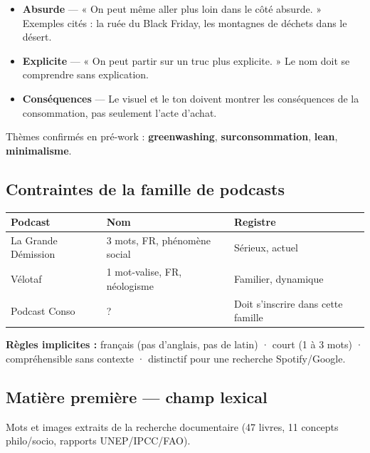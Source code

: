 \documentclass[a4paper,11pt]{article}
\newcommand{\tableheader}{\rowcolor{tableHeader}\bfseries}
\begin{document}
\begin{tcolorbox}[highlight card, title=Brief créatif — verbatim Olivier]
\begin{itemize}[nosep]
  \item \textbf{Absurde} — « On peut même aller plus loin dans le côté absurde. » Exemples cités : la ruée du Black Friday, les montagnes de déchets dans le désert.
  \item \textbf{Explicite} — « On peut partir sur un truc plus explicite. » Le nom doit se comprendre sans explication.
  \item \textbf{Conséquences} — Le visuel et le ton doivent montrer les conséquences de la consommation, pas seulement l'acte d'achat.
\end{itemize}
\end{tcolorbox}

\noindent Thèmes confirmés en pré-work : \textbf{greenwashing}, \textbf{surconsommation}, \textbf{lean}, \textbf{minimalisme}.

\subsection{Contraintes de la famille de podcasts}

\begin{tcolorbox}[card]
\begin{tabularx}{\textwidth}{@{}llX@{}}
\toprule
\tableheader Podcast & Nom & Registre \\
\midrule
La Grande Démission & 3 mots, FR, phénomène social & Sérieux, actuel \\
Vélotaf & 1 mot-valise, FR, néologisme & Familier, dynamique \\
Podcast Conso & ? & Doit s'inscrire dans cette famille \\
\bottomrule
\end{tabularx}
\end{tcolorbox}

\noindent \textbf{Règles implicites :} français (pas d'anglais, pas de latin) · court (1 à 3 mots) · compréhensible sans contexte · distinctif pour une recherche Spotify/Google.

\subsection{Matière première — champ lexical}

Mots et images extraits de la recherche documentaire (47 livres, 11 concepts philo/socio, rapports UNEP/IPCC/FAO).
\end{document}

